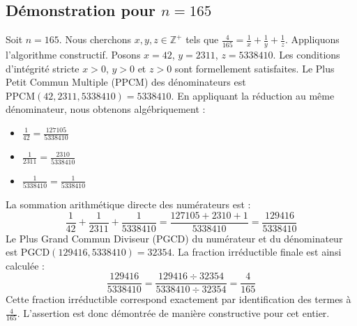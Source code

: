 \documentclass[11pt,a4paper]{article}
\begin{document}
\subsection{Démonstration pour $n = 165$}
Soit $n = 165$. Nous cherchons $x, y, z \in \mathbb{Z}^{+}$ tels que $\frac{4}{165} = \frac{1}{x} + \frac{1}{y} + \frac{1}{z}$.
Appliquons l'algorithme constructif. Posons $x = 42$, $y = 2311$, $z = 5338410$.
Les conditions d'intégrité stricte $x > 0$, $y > 0$ et $z > 0$ sont formellement satisfaites.
Le Plus Petit Commun Multiple (PPCM) des dénominateurs est $\text{PPCM}(42, 2311, 5338410) = 5338410$.
En appliquant la réduction au même dénominateur, nous obtenons algébriquement :
\begin{itemize}
    \item $\frac{1}{42} = \frac{127105}{5338410}$
    \item $\frac{1}{2311} = \frac{2310}{5338410}$
    \item $\frac{1}{5338410} = \frac{1}{5338410}$
\end{itemize}
La sommation arithmétique directe des numérateurs est :
$$ \frac{1}{42} + \frac{1}{2311} + \frac{1}{5338410} = \frac{127105 + 2310 + 1}{5338410} = \frac{129416}{5338410} $$
Le Plus Grand Commun Diviseur (PGCD) du numérateur et du dénominateur est $\text{PGCD}(129416, 5338410) = 32354$.
La fraction irréductible finale est ainsi calculée :
$$ \frac{129416}{5338410} = \frac{129416 \div 32354}{5338410 \div 32354} = \frac{4}{165} $$
Cette fraction irréductible correspond exactement par identification des termes à $\frac{4}{165}$. L'assertion est donc démontrée de manière constructive pour cet entier.
\end{document}
